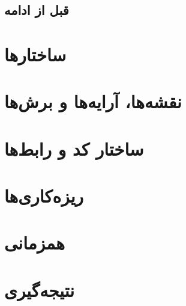 \documentclass{book}
\begin{document}
\newpage
\section{قبل از ادامه}
\chapter{ ساختارها }
\chapter{ نقشه‌ها، آرایه‌ها و برش‌ها }
\chapter{ساختار کد و رابط‌ها }
\chapter{ریزه‌کاری‌ها }
\chapter{همزمانی}
\chapter{نتیجه‌گیری}
\end{document}
